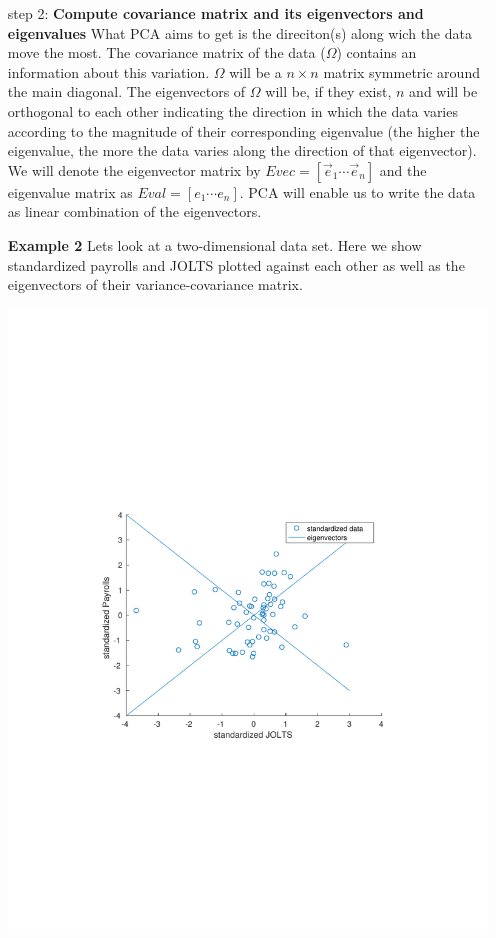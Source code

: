 \documentclass[11pt]{article}
\theoremstyle{definition}
\begin{document}
\begin{itemize}
\item[step 2:] \textbf{Compute covariance matrix and its eigenvectors and eigenvalues}\newline
What PCA aims to get is the direciton(s) along wich the data move the most. The covariance matrix of the data ($\Omega$) contains an information about this variation. $\Omega$ will be a $n\times n$ matrix symmetric around the main diagonal. The eigenvectors of $\Omega$ will be, if they exist, $n$ and will be orthogonal to each other indicating the direction in which the data varies according to the magnitude of their corresponding eigenvalue (the higher the eigenvalue, the more the data varies along the direction of that eigenvector). We will denote the eigenvector matrix by $Evec = [\vec{e}_{1}\cdots \vec{e}_{n}]$ and the eigenvalue matrix as $Eval = [e_{1} \cdots e_{n}]$. PCA will enable us to write the data as linear combination of the eigenvectors.
\begin{shaded}
\textbf{Example 2} \newline
Lets look at a two-dimensional data set. Here we show standardized payrolls and JOLTS plotted against each other as well as the eigenvectors of their variance-covariance matrix.
\begin{center}
\includegraphics[scale=0.45,trim={0cm, 8cm, 0cm, 8cm}, clip]{plots/eig_plot.pdf}
\end{center}
\end{shaded}			


\end{itemize}
\end{document}
